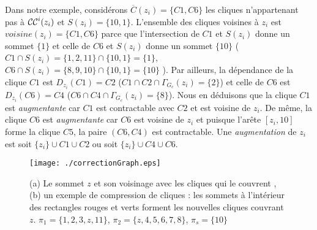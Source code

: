 Dans notre exemple, consid\'erons  $\overbar{C}(z_i) = \{C1, C6\}$  les cliques n'appartenant pas \`a ${\cal CC}^{i}(z_i)$ et $S(z_i) = \{10,1\}$.
L'ensemble des cliques voisines \`a $z_i$ est $voisine(z_i) = \{C1, C6\}$ parce que l'intersection de $C1$ et $S(z_i)$ donne un sommet $\{1\}$ et celle de $C6$ et $S(z_i)$ donne un sommet $\{10\}$
($C1 \cap S(z_i) = \{1,2,11\} \cap \{10,1\} = \{1\}$,
$C6 \cap S(z_i) = \{8,9,10\} \cap \{10,1\} = \{10\}$
).
Par ailleurs, la d\'ependance de la clique $C1$ est $D_{z_i}(C1) = C2$ ($C1 \cap C2 \cap \Gamma_{G_c}(z_i) = \{2\}$) et celle de $C6$ est $D_{z_i}(C6) = C4$ ($C6 \cap C4 \cap \Gamma_{G_c}(z_i) = \{8\}$). 
Nous en d\'eduisons que la clique $C1$ est {\em augmentante} car  $C1$ est contractable avec $C2$ et est voisine de $z_i$. De m\^eme, la clique $C6$ est {\em augmentante} car $C6$ est voisine de $z_i$ et puisque l'ar\^ete $[z_i,10]$ forme la clique $C5$, la paire $(C6,C4)$ est contractable.
Une {\em augmentation} de $z_i$ est soit $\{z_i\} \cup C1 \cup C2$ ou soit $\{z_i\} \cup C4 \cup C6$.
\begin{figure}[htb!]
\centering
\texttt{[image: ./correctionGraph.eps]} \vspace{-0.5em}
\caption{(a) Le sommet $z$ et son voisinage avec les cliques qui le couvrent , (b) un exemple de compression de cliques :  les sommets \`a l'int\'erieur des rectangles rouges et verts forment les nouvelles cliques couvrant $z$.
		$\pi_1 = \{1,2,3,z,11\}$, $\pi_2 = \{z,4,5,6,7,8\}$, $\pi_s = \{10\}$ 
		}
\label{exempleAlgoCorrectionGraphe}
\end{figure}
\FloatBarrier

